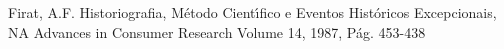 \documentclass[
12pt,		%
openright,	%
twoside,  %
a4paper,			%
chapter=TITLE,		%
english,			%
french,				%
spanish,			%
brazil				%
]{USPSC-classe/USPSC_RedarTex}
\begin{document}
\begin{flushleft}
\begin{flushleft}
\begin{flushleft}
\begin{flushleft}
\begin{flushleft}
\begin{flushleft}
\begin{flushleft}
\begin{flushleft}
\begin{flushleft}
\begin{flushleft}
[Firat, 1987] Firat, A.F. Historiografia, M\'etodo Cient\'{\i}fico e Eventos Hist\'oricos Excepcionais, NA Advances in Consumer Research Volume 14, 1987, P\'ag. 453-438
\end{flushleft}


\end{flushleft}


\end{flushleft}


\end{flushleft}


\end{flushleft}


\end{flushleft}


\end{flushleft}


\end{flushleft}


\end{flushleft}


\end{flushleft}
\end{document}
